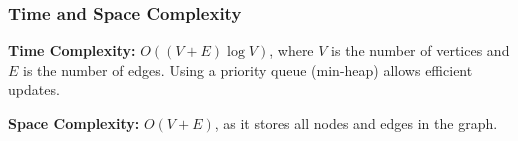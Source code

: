 \subsubsection{Time and Space Complexity}
\textbf{Time Complexity:} \( O((V + E) \log V) \), where \( V \) is the number of vertices and \( E \) is the number of edges. Using a priority queue (min-heap) allows efficient updates.

\textbf{Space Complexity:} \( O(V + E) \), as it stores all nodes and edges in the graph.